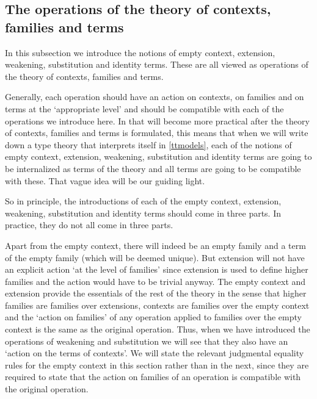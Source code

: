 \subsection{The operations of the theory of contexts, families and terms}
In this subsection we introduce the notions of empty context,
extension, weakening, substitution and identity terms. These are all viewed as
operations of the theory of contexts, families and terms. 

Generally, 
each operation should
have an action on contexts, on families and on terms at the `appropriate level'
and should be compatible with each of the operations we introduce here. In
that will become more practical after the theory of contexts, families and terms
is formulated, this means that when we will write down a type theory that
interprets itself in \autoref{ttmodels}, each of the notions of empty context,
extension, weakening, substitution and identity terms are going to be internalized
as terms of the theory and all terms are going to be compatible with these.
That vague idea will be our guiding light.

So in principle, the introductions of each of the empty context, extension,
weakening, substitution and identity terms should come in three parts. In 
practice, they do not all come in three parts.

Apart from the empty context, there will indeed be an empty family and a term
of the empty family (which will be deemed unique). But extension will
not have an explicit action `at the level of families' since extension
is used to define higher families and the action would have to be trivial
anyway. The empty context and extension provide the essentials of the rest of
the theory in the sense that higher families are families over extensions,
contexts are families over the empty context and the `action on families' of
any operation applied to families over the empty context is the same as the
original operation. Thus, when we have introduced the operations of weakening
and substitution we will see that they also have an `action on the terms of 
contexts'. We will state the relevant judgmental equality rules for the empty
context in this section rather than in the next, since they are required to
state that the action on families of an operation is compatible with the
original operation.

